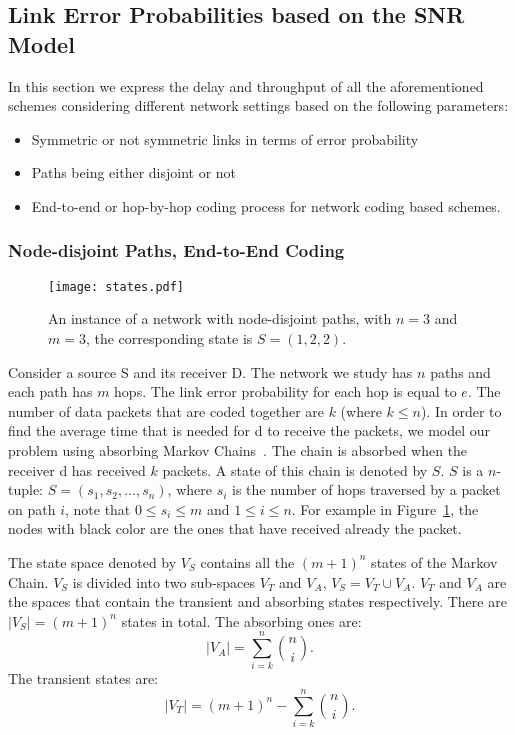 \documentclass[journal, onecolumn, 12pt]{IEEEtran}
\begin{document}
\subsection{Link Error Probabilities based on the SNR Model}
\label{sec:analysis_snr_model}
In this section we express the delay and throughput of all the aforementioned schemes
considering different network settings based on the following parameters:
\begin{itemize}
\item Symmetric or not symmetric links in terms of error probability
\item Paths being either disjoint or not
\item End-to-end or hop-by-hop coding process for network coding based schemes.
\end{itemize}

\subsubsection{Node-disjoint Paths, End-to-End Coding}
\label{sec:analysis_node_disjoint_paths}

\begin{figure}
\begin{center}
\texttt{[image: states.pdf]}
\caption{An instance of a network with node-disjoint paths, with $n=3$ and $m=3$, the corresponding state is $S=(1,2,2)$.}
\label{fig:state}
\end{center}
\end{figure}

Consider a source S and its receiver D.
The network we study has $n$ paths and each path has $m$ hops.
The link error probability for each hop is equal to $e$.
The number of data packets that are coded together are $k$ (where $k \leq n$).
In order to find the average time that is needed for d to receive the packets, we model our problem using absorbing Markov Chains~\cite{b:prob}.
The chain is absorbed when the receiver d has received $k$ packets.
A state of this chain is denoted by $S$.
$S$ is a $n$- tuple: $S=(s_{1},s_{2},...,s_{n})$, where $s_{i}$ is the number of hops traversed by a packet on path $i$, note that $0 \leq s_{i} \leq m$ and $1 \leq i \leq n$.
For example in Figure~\ref{fig:state}, the nodes with black color are the ones that have received already the packet.

The state space denoted by $V_{S}$ contains all the $(m+1)^{n}$ states of the Markov Chain. $V_{S}$ is divided into two sub-spaces $V_{T}$ and $V_{A}$, $V_{S}=V_{T} \cup V_{A}$. $V_{T}$ and $V_{A}$ are the spaces that contain the transient and absorbing states respectively. There are $\left| V_{S} \right| = (m+1)^{n}$ states in total.
The absorbing ones are:
\begin{equation}
\left| V_{A} \right| = \sum_{i=k}^n {n\choose i}.
\end{equation}
The transient states are:
\begin{equation}
\left| V_{T} \right| =(m+1)^{n} - \sum_{i=k}^n {n\choose i}.
\end{equation}
\end{document}
